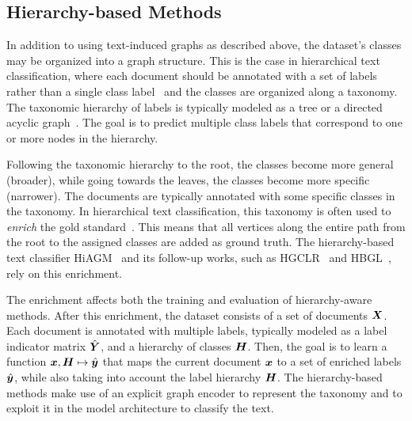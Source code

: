 \documentclass[lettersize,journal]{IEEEtran}
\begin{document}
\subsection{Hierarchy-based Methods}
\label{sec:rw:hierarcy-based-methods}
In addition to using text-induced graphs as described above, the dataset's classes may be organized into a graph structure.
This is the case in hierarchical text classification, where each document should be annotated with a set of labels rather than a single class label~\cite{DBLP:journals/csur/Sebastiani02} and the classes are organized along a taxonomy. 
The taxonomic hierarchy of labels is typically modeled as a tree or a directed acyclic graph~\cite{shen-etal-2021-taxoclass,hiagm,pengHierarchicalTaxonomyAwareAttentional2021}. 
The goal is to predict multiple class labels that correspond to one or more nodes in the hierarchy.

Following the taxonomic hierarchy to the root, the classes become more general (broader), while going towards the leaves, the classes become more specific (narrower).
The documents are typically annotated with some specific classes in the taxonomy.
In hierarchical text classification, this taxonomy is often used to \emph{enrich} the gold standard~\cite{hiagm}. 
This means that all vertices along the entire path from the root to the assigned classes are added as ground truth.
The hierarchy-based text classifier HiAGM~\cite{hiagm} and its follow-up works, such as HGCLR~\cite{DBLP:conf/acl/WangWH0W22} and HBGL~\cite{hbgl}, rely on this enrichment.

The enrichment affects both the training and evaluation of hierarchy-aware methods.
After this enrichment, the dataset consists of a set of documents ${\bm{X}}$. Each document is annotated with multiple labels, typically modeled as a label indicator matrix $\hat{{\bm{Y}}}$, and a hierarchy of classes ${\bm{H}}$.
Then, the goal is to learn a function ${\bm{x}}, {\bm{H}} \mapsto \hat{{\bm{y}}}$ that maps the current document ${\bm{x}}$ to a set of enriched labels $\hat{{\bm{y}}}$, while also taking into account the label hierarchy ${\bm{H}}$. 
The hierarchy-based methods make use of an explicit graph encoder to represent the taxonomy and to exploit it in the model architecture to classify the text.
\end{document}

